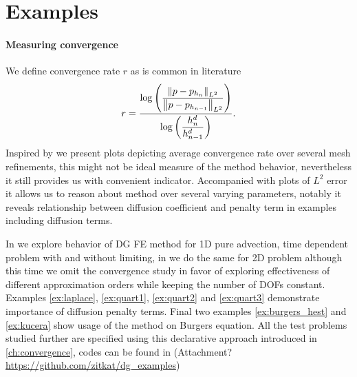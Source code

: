 \section{Examples}

\paragraph{Measuring convergence} We define convergence rate $r$ as is common 
in literature
\begin{equation}
r = \frac{\log\left(\dfrac{\left\lVert p - p_{h_{n}}\right\rVert_{L^2}}{\left\lVert p - p_{h_{n-1}}\right\rVert_{L^2}}\right)}
{\log\left(\dfrac{h^d_{n}}{h^d_{n-1}}\right)}.
\end{equation}
Inspired by \cite{Kucera} we present plots depicting average convergence rate 
over several mesh refinements, this might not be ideal measure of the method 
behavior, nevertheless it still provides us with convenient indicator. 
Accompanied with plots of $L^2$ error it allows us to reason about method over 
several varying parameters, notably it reveals relationship between diffusion 
coefficient and penalty term in examples including diffusion terms.

In  we explore behavior of DG FE method for 1D pure advection, 
time dependent problem with and without limiting, in  we do the same 
for 2D problem although this time we omit the convergence study in favor of exploring 
effectiveness of different approximation orders while keeping the number of DOFs 
constant. Examples \ref{ex:laplace}, \ref{ex:quart1}, \ref{ex:quart2} and \ref{ex:quart3} 
demonstrate importance of diffusion penalty terms. Final two examples 
\ref{ex:burgers_hest} and 
\ref{ex:kucera} show usage of the method on Burgers equation. All the test problems 
studied further are specified using this declarative approach introduced in 
\ref{ch:convergence}, codes can be found in (\todo Attachment? 
\url{https://github.com/zitkat/dg_examples})
